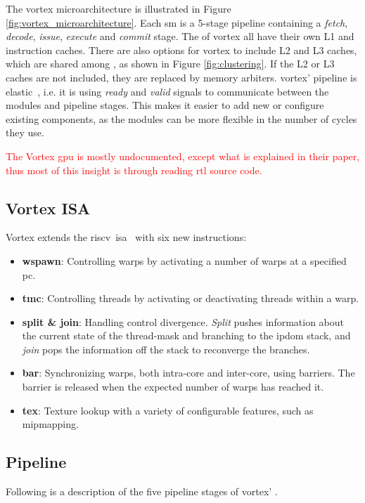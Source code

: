 The \Gls{vortex} microarchitecture is illustrated in Figure \ref{fig:vortex_microarchitecture}. Each \acrshort{sm} is a 5-stage pipeline containing a \textit{fetch}, \textit{decode}, \textit{issue}, \textit{execute} and \textit{commit} stage. The  of \Gls{vortex} all have their own L1 and instruction caches. There are also options for \Gls{vortex} to include L2 and L3 caches, which are shared among , as shown in Figure \ref{fig:clustering}. If the L2 or L3 caches are not included, they are replaced by memory arbiters. \Gls{vortex}' pipeline is elastic~\cite{elastic_pipeline}, i.e. it is using \textit{ready} and \textit{valid} signals to communicate between the modules and pipeline stages. This makes it easier to add new or configure existing components, as the modules can be more flexible in the number of cycles they use.

\textcolor{red}{The Vortex gpu is mostly undocumented, except what is explained in their paper, thus most of this insight is through reading rtl source code.}

\subsection{Vortex ISA}

Vortex extends the \gls{riscv}~\acrshort{isa}~\cite{riscv-isa} with six new instructions:
\begin{itemize}
    \item \textbf{wspawn}: Controlling warps by activating a number of warps at a specified \acrshort{pc}.
    \item \textbf{tmc}: Controlling threads by activating or deactivating threads within a warp. 
    \item \textbf{split \& join}: Handling control divergence. \textit{Split} pushes information about the current state of the thread-mask and branching to the \acrfull{ipdom} stack, and \textit{join} pops the information off the stack to reconverge the branches.
    \item \textbf{bar}: Synchronizing warps, both intra-core and inter-core, using barriers. The barrier is released when the expected number of warps has reached it.  
    \item \textbf{tex}: Texture lookup with a variety of configurable features, such as mipmapping. 
\end{itemize}

\subsection{Pipeline} \label{sec:vortex_pipeline}
Following is a description of the five pipeline stages of \Gls{vortex}' .

